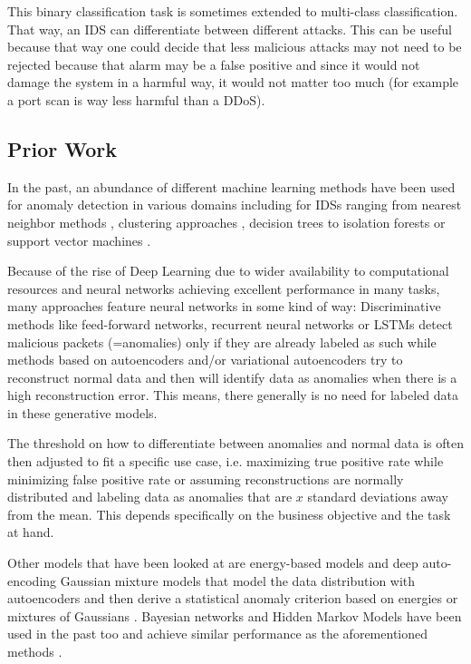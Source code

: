 \documentclass[]{article}
\begin{document}
This binary classification task is sometimes extended to multi-class classification. That way, an IDS can differentiate between different attacks. This can be useful because that way one could decide that less malicious attacks may not need to be rejected because that alarm may be a false positive and since it would not damage the system in a harmful way, it would not matter too much (for example a port scan is way less harmful than a DDoS).

\subsection{Prior Work}
In the past, an abundance of different machine learning methods have been used for anomaly detection in various domains including for IDSs ranging from nearest neighbor methods \cite{5377998}, clustering approaches \cite{4244796}, decision trees \cite{6511281} to isolation forests \cite{DING201312} or support vector machines \cite{1234567}. 
\newline

\noindent
Because of the rise of Deep Learning due to wider availability to computational resources and neural networks achieving excellent performance in many tasks, many approaches feature neural networks in some kind of way: Discriminative methods like feed-forward networks, recurrent neural networks or LSTMs detect malicious packets (=anomalies) only if they are already labeled as such while methods based on autoencoders and/or variational autoencoders try to reconstruct normal data and then will identify data as anomalies when there is a high reconstruction error. This means, there generally is no need for labeled data in these generative models. 

The threshold on how to differentiate between anomalies and normal data is often then adjusted to fit a specific use case, i.e. maximizing true positive rate while minimizing false positive rate or assuming reconstructions are normally distributed and labeling data as anomalies that are $x$ standard deviations away from the mean. This depends specifically on the business objective and the task at hand.
\newline

\noindent
Other models that have been looked at are energy-based models and deep auto-encoding Gaussian mixture models that model the data distribution with autoencoders and then derive a statistical anomaly criterion based on energies or mixtures of Gaussians \cite{https://doi.org/10.48550/arxiv.1812.02288}. Bayesian networks and Hidden Markov Models have been used in the past too and achieve similar performance as the aforementioned methods \cite{inproceedings}.
\newline
\end{document}
